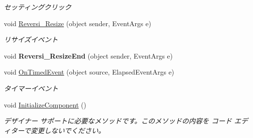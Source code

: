 \begin{DoxyCompactItemize}
\begin{DoxyCompactList}\small\item\em セッティングクリック \end{DoxyCompactList}\item 
void \hyperlink{class_reversi4color_form_1_1_reversi_afacffb0f4d383892677acfd1b7304606}{Reversi\+\_\+\+Resize} (object sender, Event\+Args e)
\begin{DoxyCompactList}\small\item\em リサイズイベント \end{DoxyCompactList}\item 
\mbox{\label{class_reversi4color_form_1_1_reversi_ad13d5590335e33bf4be4fd98394a43eb}} 
void {\bfseries Reversi\+\_\+\+Resize\+End} (object sender, Event\+Args e)
\item 
void \hyperlink{class_reversi4color_form_1_1_reversi_a601896143334140db49faaa57b710aa6}{On\+Timed\+Event} (object source, Elapsed\+Event\+Args e)
\begin{DoxyCompactList}\small\item\em タイマーイベント \end{DoxyCompactList}\item 
void \hyperlink{class_reversi4color_form_1_1_reversi_a9eb7787e255c6aab7c75d6f0730e579e}{Initialize\+Component} ()
\begin{DoxyCompactList}\small\item\em デザイナー サポートに必要なメソッドです。このメソッドの内容を コード エディターで変更しないでください。 \end{DoxyCompactList}\end{DoxyCompactItemize}
